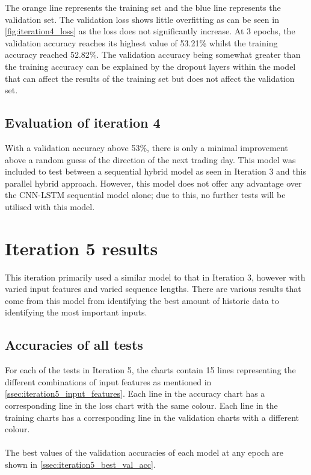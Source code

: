 The orange line represents the training set and the blue line represents
the validation set. The validation loss shows little overfitting as can be seen in
\autoref{fig:iteration4_loss} as the loss does not significantly increase. At 3 epochs,
the validation accuracy reaches its highest value of 53.21\% whilst the training accuracy reached 52.82\%. The validation accuracy being somewhat greater than the
training accuracy can be explained by the dropout layers within the model that can affect the results of the training
set but does not affect the validation set.

\subsection{Evaluation of iteration 4}
With a validation accuracy above 53\%, there is only a minimal improvement above a random guess of the direction
of the next trading day. This model was included to test between a sequential hybrid model as seen in Iteration 3
and this parallel hybrid approach. However, this model does not offer any advantage over the CNN-LSTM sequential
model alone; due to this, no further tests will be utilised with this model.

\section{Iteration 5 results}\label{iteration5_results}
This iteration primarily used a similar model to that in Iteration 3, however with varied input features
and varied sequence lengths. There are various results that come from this model from identifying the
best amount of historic data to identifying the most important inputs.

\subsection{Accuracies of all tests}

For each of the tests in Iteration 5, the charts contain 15 lines representing the different combinations
of input features as mentioned in \autoref{ssec:iteration5_input_features}. Each line in the accuracy chart
has a corresponding line in the loss chart with the same colour. Each line in the training charts has a 
corresponding line in the validation charts with a different colour.\\
\\
The best values of the validation accuracies of each model at any epoch are shown in
\autoref{ssec:iteration5_best_val_acc}.

